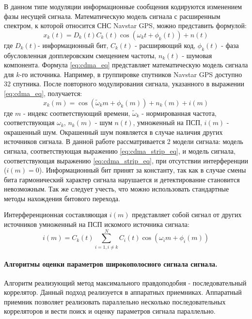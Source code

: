 В данном типе модуляции информационные сообщения кодируются изменением фазы несущей сигнала.
Математическую модель сигнала с расширенным спектром, к которой относится СНС Navstar GPS, можно представить формулой:
\begin{equation}
	\label{eq:cdma_eq}
	x_k(t)=D_k(t)C_k(t)\cos{(\omega_{k}t + \phi_k(t))} + n(t)
\end{equation}
где ${D_k}(t)$- информационный бит, ${C_k}(t)$ - расширяющий код, ${\phi_k(t)}$ - фаза обусловленная допплеровским смещением частоты, 
${n_k(t)}$ - шумовая компонента. Формула  \ref{eq:cdma_eq} представляет математическую модель сигнала для ${k}$-го источника.
Например, в группировке спутников Navstar GPS доступно 32 спутника. После повторного модулирования сигнала, указанного в выражении \ref{eq:cdma_eq},
получается:
\begin{equation}
	\label{eq:cdma_strip_eq}
	x_k(m)=\cos{(\tilde{\omega}_{k}m + \phi_k(m))} + n_k(m) + i(m)
\end{equation}
где ${m}$ - индекс соответствующий времени, ${\tilde{\omega}_k}$ - нормированная частота, соответствующая ${\omega_k}$, ${n_k}(m)$ - шум ${n(t)}$, умноженный на ПСП,
${i(m)}$ - окрашенный шум. Окрашенный шум появляется в случае наличия других источников сигнала.
В данной работе рассматривается 2 модели сигнала: модель сигнала, соответствующая выражению \ref{eq:cdma_strip_eq}, и модель сигнала,
соответствующая выражению \ref{eq:cdma_strip_eq}, при отсутствии интерференции (${i(m)=0}$).
Информационный бит принят за константу, так как в случае смены бита гармонический характер сигнала нарушается и детектирование становится невозможным.
Так же следует учесть, что можно использовать стандартные методы нахождения битового перехода.

Интерференционная составляющая ${i(m)}$ представляет собой сигнал от других источников умноженный на ПСП искомого источника сигнала:
\begin{equation}
	\label{eq:cdma_interference}
	i(m) = C_k(t) \sum\limits_{i=1, i \ne k}^{N}C_i(t)\cos{(\omega_{i}m + \phi_i(m))}
\end{equation}

\paragraph{Алгоритмы оценки параметров широкополосного сигнала сигнала.}
Алгоритм реализующий метод максимального правдоподобия - последовательный коррелятор. Данный подход реализуется в аппаратных приемниках.
Аппаратный приемник позволяет реализовать параллельно несколько последовательных корреляторов и вести поиск и оценку параметров
сигнала параллельно.

